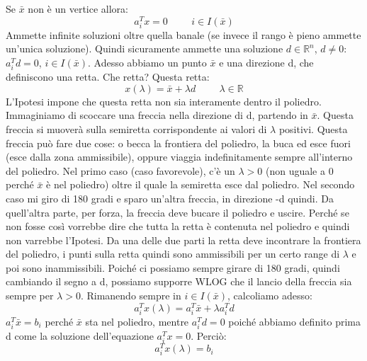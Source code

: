 \noindent Se $\bar{x}$ non è un vertice allora:
\begin{equation*}
    a_i^Tx = 0 \hspace{1cm} i \in I(\bar{x})
\end{equation*}
Ammette infinite soluzioni oltre quella banale (se invece il rango è pieno ammette un'unica soluzione). Quindi sicuramente ammette una soluzione $d \in \mathbb{R}^n$, $d \neq 0$: $a_i^T d = 0$, $i \in I(\bar{x})$. Adesso abbiamo un punto $\bar{x}$ e una direzione d, che definiscono una retta. Che retta? Questa retta:
\begin{equation*}
    x(\lambda) = \bar{x} + \lambda d \hspace{1cm} \lambda \in \mathbb{R}
\end{equation*}
L'Ipotesi impone che questa retta non sia interamente dentro il poliedro. Immaginiamo di scoccare una freccia nella direzione di d, partendo in $\bar{x}$. Questa freccia si muoverà sulla semiretta corrispondente ai valori di $\lambda$ positivi. Questa freccia può fare due cose: o becca la frontiera del poliedro, la buca ed esce fuori (esce dalla zona ammissibile), oppure viaggia indefinitamente sempre all'interno del poliedro. Nel primo caso (caso favorevole), c'è un $\lambda > 0$ (non uguale a 0 perché $\bar{x}$ è nel poliedro) oltre il quale la semiretta esce dal poliedro. Nel secondo caso mi giro di 180 gradi e sparo un'altra freccia, in direzione -d quindi. Da quell'altra parte, per forza, la freccia deve bucare il poliedro e uscire. Perché se non fosse così vorrebbe dire che tutta la retta è contenuta nel poliedro e quindi non varrebbe l'Ipotesi. Da una delle due parti la retta deve incontrare la frontiera del poliedro, i punti sulla retta quindi sono ammissibili per un certo range di $\lambda$ e poi sono inammissibili. Poiché ci possiamo sempre girare di 180 gradi, quindi cambiando il segno a d, possiamo supporre WLOG che il lancio della freccia sia sempre per $\lambda > 0$. Rimanendo sempre in $i \in I(\bar{x})$, calcoliamo adesso:
\begin{equation*}
    a_i^Tx(\lambda) = a_i^T\bar{x} + \lambda a_i^T d 
\end{equation*}
$a_i^T\bar{x} = b_i$ perché $\bar{x}$ sta nel poliedro, mentre $a_i^T d = 0$ poiché abbiamo definito prima d come la soluzione dell'equazione $a_i^T x = 0$. Perciò:
\begin{equation*}
    a_i^Tx(\lambda) = b_i
\end{equation*}

